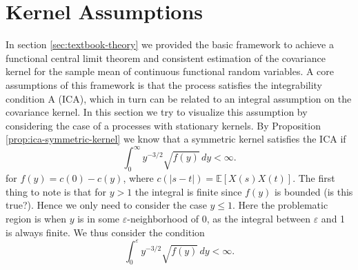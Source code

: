\section{Kernel Assumptions}

In section \ref{sec:textbook-theory} we provided the basic framework to achieve a
functional central limit theorem and consistent estimation of the covariance kernel for
the sample mean of continuous functional random variables. A core assumptions of this
framework is that the process satisfies the integrability condition A (ICA), which in
turn can be related to an integral assumption on the covariance kernel. In this section
we try to visualize this assumption by considering the case of a processes with
stationary kernels. By Proposition \ref{prop:ica-symmetric-kernel}
we know that a symmetric kernel satisfies the ICA if
\[
    \int_0^\infty y^{-3/2} \sqrt{f(y)} \, dy < \infty.
\]
for $f(y) = c(0) - c(y)$, where $c(|s-t|) = \mathbb{E}[X(s)X(t)]$. The first thing to
note is that for $y > 1$ the integral is finite since $f(y)$ is bounded (is this true?).
Hence we only need to consider the case $y \leq 1$. Here the problematic region is
when $y$ is in some $\varepsilon$-neighborhood of $0$, as the integral between $\varepsilon$ and 1 is
always finite. We thus consider the condition
\[
    \int_0^\varepsilon y^{-3/2} \sqrt{f(y)} \, dy < \infty.
\]
